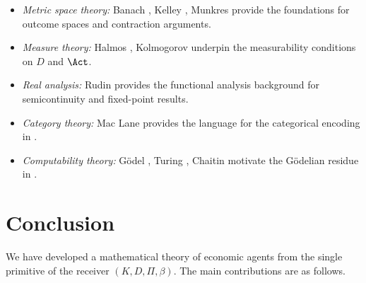 \documentclass[twocolumn,11pt,a4paper]{article}
\begin{document}
\begin{itemize}[leftmargin=*]
  \item \textit{Metric space theory:} Banach \cite{banach1922}, Kelley
    \cite{kelley1955}, Munkres \cite{munkres2000} provide the foundations
    for outcome spaces and contraction arguments.
  \item \textit{Measure theory:} Halmos \cite{halmos1950}, Kolmogorov
    \cite{kolmogorov1933} underpin the measurability conditions on $D$
    and $\Act$.
  \item \textit{Real analysis:} Rudin \cite{rudin1976} provides the
    functional analysis background for semicontinuity and fixed-point
    results.
  \item \textit{Category theory:} Mac Lane \cite{maclane1998} provides
    the language for the categorical encoding in .
  \item \textit{Computability theory:} G\"odel \cite{godel1931}, Turing
    \cite{turing1936}, Chaitin \cite{chaitin1974} motivate the
    G\"odelian residue in .
\end{itemize}

\section{Conclusion}
\label{sec:conclusion}

We have developed a mathematical theory of economic agents from the single
primitive of the receiver $(K,D,\Pi,\beta)$.  The main contributions are
as follows.
\end{document}
